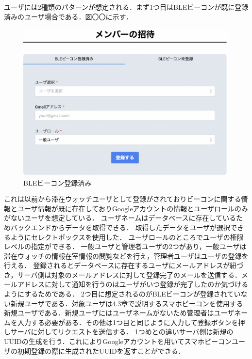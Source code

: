 ユーザには2種類のパターンが想定される．まず1つ目はBLEビーコンが既に登録済みのユーザ場合である．図〇〇に示す．
\begin{figure}[tbh]
  \centering
  \includegraphics[width=16cm]{image/registerBLE.png}
  \caption{BLEビーコン登録済み}
  \label{multipleBPM}
\end{figure}
これは以前から滞在ウォッチユーザとして登録がされておりビーコンに関する情報とユーザ情報が既に存在しておりGoogleアカウントの情報とユーザロールのみがないユーザを想定している．
ユーザネームはデータベースに存在しているためバックエンドからデータを取得できる．
取得したデータをユーザが選択できるようにセレクトボックスを使用した．
ユーザロールのところでユーザの権限レベルの指定ができる．
一般ユーザと管理者ユーザの2つがあり，一般ユーザは滞在ウォッチの情報在室情報の閲覧などを行え，管理者ユーザはユーザの登録を行える．
登録されるとデータベースに存在するユーザにメールアドレスが紐づき，サーバ側は対象のメールアドレスに対して登録完了のメールを送信する．メールアドレスに対して通知を行うのはユーザがいつ登録が完了したのか気づけるようにするためである．
2つ目に想定されるのがBLEビーコンが登録されていない新規ユーザである．対象ユーザは4.3章で説明するスマホビーコンを使用する新規ユーザである．新規ユーザにはユーザネームがないため管理者はユーザネームを入力する必要がある．その他は1つ目と同じように入力して登録ボタンを押しサーバに対してリクエストを送信する．
1つめとの違いサーバ側は新規のUUIDの生成を行う．これによりGoogleアカウントを用いてスマホビーコンユーザの初期登録の際に生成されたUUIDを返すことができる．



